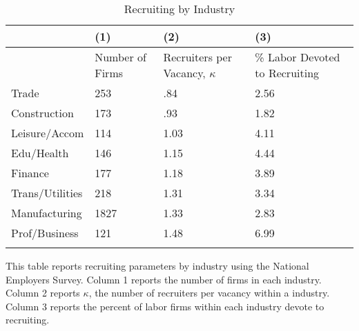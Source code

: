 \begin{table}[tbp] \centering
{}

\caption{Recruiting by Industry}
\label{tab:rc}
\begin{tabularx}{\linewidth}{lCCC}

\toprule
&{(1)}&{(2)}&{(3)} \tabularnewline \midrule
{}&{Number of Firms}&{Recruiters per Vacancy, $\kappa$}&{\% Labor Devoted to Recruiting} \tabularnewline
\midrule \addlinespace[\belowrulesep]
Trade&253&.84&2.56 \tabularnewline
Construction&173&.93&1.82 \tabularnewline
Leisure/Accom&114&1.03&4.11 \tabularnewline
Edu/Health&146&1.15&4.44 \tabularnewline
Finance&177&1.18&3.89 \tabularnewline
Trans/Utilities&218&1.31&3.34 \tabularnewline
Manufacturing&1827&1.33&2.83 \tabularnewline
Prof/Business&121&1.48&6.99 \tabularnewline
\bottomrule \addlinespace[\belowrulesep]

\end{tabularx}
\begin{flushleft}
\footnotesize This table reports recruiting parameters by industry using the National Employers Survey. Column 1 reports the number of firms in each industry. Column 2 reports $\kappa$, the number of recruiters per vacancy within a industry. Column 3 reports the percent of labor firms within each industry devote to recruiting.
\end{flushleft}
\end{table}
